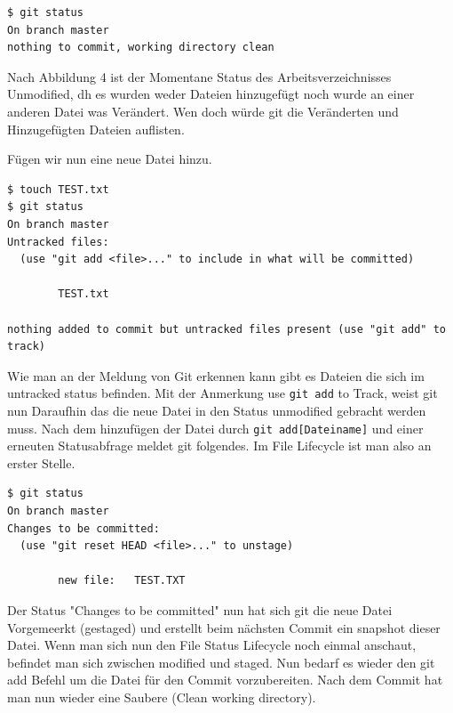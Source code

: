 \documentclass[12pt,a4paper,bibliography=totocnumbered,listof=totocnumbered]{scrartcl}
\begin{document}
\vspace{1em}
\begin{lstlisting}[caption=Git Statusbefehl nach git clone befehl, label=lst:arduino]
$ git status
On branch master
nothing to commit, working directory clean 
\end{lstlisting}

Nach Abbildung 4 ist der Momentane Status des Arbeitsverzeichnisses Unmodified, dh 
es wurden weder Dateien hinzugefügt noch wurde an einer anderen Datei was Verändert. Wen doch würde git die Veränderten und Hinzugefügten Dateien auflisten.

Fügen wir nun eine neue Datei hinzu. 
\vspace{1em}
\begin{lstlisting}[caption=Git Statusbefehl nachdem erzeugen einer Datei, label=lst:arduino]
$ touch TEST.txt
$ git status
On branch master
Untracked files:
  (use "git add <file>..." to include in what will be committed)

        TEST.txt

nothing added to commit but untracked files present (use "git add" to track)

\end{lstlisting}

Wie man an der Meldung von Git erkennen kann gibt es Dateien die sich im untracked status befinden. Mit der Anmerkung use \lstinline|git add| to Track, weist git nun Daraufhin das die neue Datei in den Status unmodified gebracht werden muss. Nach dem hinzufügen der Datei durch \lstinline|git add[Dateiname]| und einer erneuten Statusabfrage meldet git folgendes.
Im File Lifecycle ist man also an erster Stelle.
\newpage
\vspace{1em}
\begin{lstlisting}[caption=Git Statusbefehl nachdem erzeugen einer Datei, label=lst:arduino]
$ git status
On branch master
Changes to be committed:
  (use "git reset HEAD <file>..." to unstage)

        new file:   TEST.TXT

\end{lstlisting}
Der Status "Changes to be committed" nun hat sich git die neue Datei Vorgemeerkt (gestaged) und erstellt beim nächsten Commit ein snapshot dieser Datei. Wenn man sich nun den File Status Lifecycle noch einmal anschaut, befindet man sich zwischen modified und staged. Nun bedarf es wieder den git add Befehl um die Datei für den Commit vorzubereiten. Nach dem Commit hat man nun wieder eine Saubere (Clean working directory). 
\end{document}
